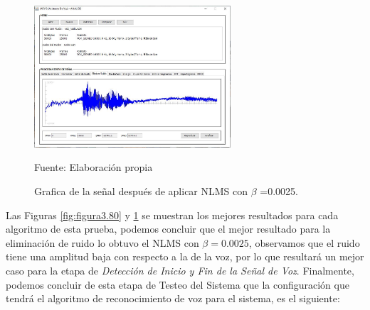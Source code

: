 \begin{figure}[H]
\begin{center}
\includegraphics[width=0.65\textwidth]{Imagenes/Cap3/image083}
\end{center}
\begin{center}
\vskip -0.5cm
\caption{\small{Grafica de la señal después de aplicar NLMS con $\beta$ =0.0025.}}
\label{fig:figura3.83}
{\small{Fuente: Elaboración propia}}
\end{center}
\end{figure}

Las Figuras \ref{fig:figura3.80} y \ref{fig:figura3.83} se muestran los mejores resultados para cada algoritmo de esta prueba, podemos concluir que el mejor resultado para la eliminación de ruido lo obtuvo el NLMS con $\beta = 0.0025$, observamos que el ruido tiene una amplitud baja con respecto a la de la voz, por lo que resultará un mejor caso para la etapa de \textit{Detección de Inicio y Fin de la Señal de Voz}. Finalmente, podemos concluir de esta etapa de Testeo del Sistema que la configuración que tendrá el algoritmo de reconocimiento de voz para el sistema, es el siguiente:

